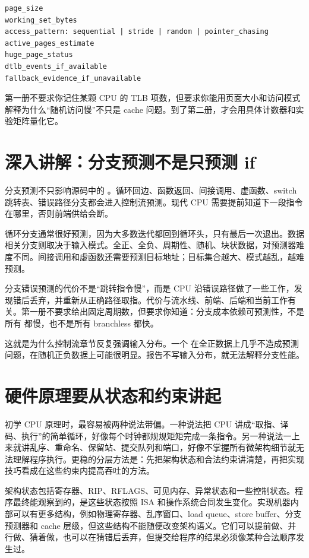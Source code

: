 \begin{lstlisting}[numbers=none,caption={TLB 报告要写清的字段}]
page_size
working_set_bytes
access_pattern: sequential | stride | random | pointer_chasing
active_pages_estimate
huge_page_status
dtlb_events_if_available
fallback_evidence_if_unavailable
\end{lstlisting}

第一册不要求你记住某颗 CPU 的 TLB 项数，但要求你能用页面大小和访问模式解释为什么“随机访问慢”不只是 cache 问题。到了第二册，才会用具体计数器和实验矩阵量化它。

\section{深入讲解：分支预测不是只预测 if}

分支预测不只影响源码中的 。循环回边、函数返回、间接调用、虚函数、switch 跳转表、错误路径分支都会进入控制流预测。现代 CPU 需要提前知道下一段指令在哪里，否则前端供给会断。

循环分支通常很好预测，因为大多数迭代都回到循环头，只有最后一次退出。数据相关分支则取决于输入模式。全正、全负、周期性、随机、块状数据，对预测器难度不同。间接调用和虚函数还需要预测目标地址；目标集合越大、模式越乱，越难预测。

分支错误预测的代价不是“跳转指令慢”，而是 CPU 沿错误路径做了一些工作，发现错后丢弃，并重新从正确路径取指。代价与流水线、前端、后端和当前工作有关。第一册不要求给出固定周期数，但要求你知道：分支成本依赖可预测性，不是所有  都慢，也不是所有 branchless 都快。

这就是为什么控制流章节反复强调输入分布。一个  在全正数据上几乎不造成预测问题，在随机正负数据上可能很明显。报告不写输入分布，就无法解释分支性能。

\section{硬件原理要从状态和约束讲起}

初学 CPU 原理时，最容易被两种说法带偏。一种说法把 CPU 讲成“取指、译码、执行”的简单循环，好像每个时钟都规规矩矩完成一条指令。另一种说法一上来就讲乱序、重命名、保留站、提交队列和端口，好像不掌握所有微架构细节就无法理解程序执行。更稳的分层方法是：先把架构状态和合法约束讲清楚，再把实现技巧看成在这些约束内提高吞吐的方法。

架构状态包括寄存器、RIP、RFLAGS、可见内存、异常状态和一些控制状态。程序最终能观察到的，是这些状态按照 ISA 和操作系统合同发生变化。实现机器内部可以有更多结构，例如物理寄存器、乱序窗口、load queue、store buffer、分支预测器和 cache 层级，但这些结构不能随便改变架构语义。它们可以提前做、并行做、猜着做，也可以在猜错后丢弃，但提交给程序的结果必须像某种合法顺序发生过。

